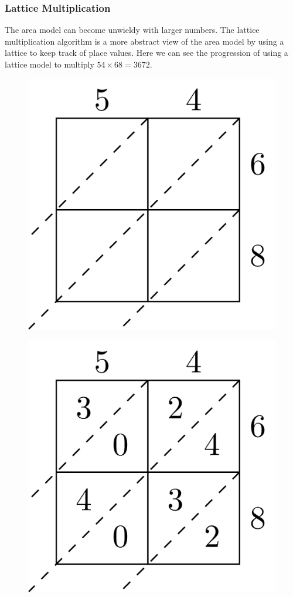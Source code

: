 \documentclass[
]{book}
\theoremstyle{definition}
\theoremstyle{definition}
\theoremstyle{definition}
\theoremstyle{definition}
\theoremstyle{remark}
\begin{document}
\hypertarget{lattice-multiplication}{%
\subsubsection*{Lattice Multiplication}\label{lattice-multiplication}}

The area model can become unwieldy with larger numbers. The lattice multiplication algorithm is a more abstract view of the area model by using a lattice to keep track of place values. Here we can see the progression of using a lattice model to multiply \(54 \times 68 = 3672\).

\begin{figure}

{\centering \includegraphics[width=0.5\linewidth]{tikz/lattice-multiplication-13-16-1} 

}

\end{figure}
\begin{figure}

{\centering \includegraphics[width=0.5\linewidth]{tikz/lattice-multiplication-13-16-2} 

}

\end{figure}
\end{document}
